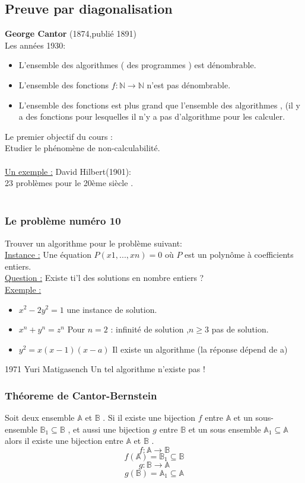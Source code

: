 \documentclass[base.tex]{subfiles}
\begin{document}
\subsection{Preuve par diagonalisation}
\textbf{George Cantor} (1874,publié 1891)
\\
Les années 1930:
\begin{itemize}
\item L'ensemble des algorithmes ( des programmes ) est dénombrable.
\item L'ensemble des fonctions $f:\mathbb{N}\rightarrow\mathbb{N}$ n'est pas dénombrable.
\item L'ensemble des fonctions est plus grand que l'ensemble des algorithmes , (il y a des fonctions pour lesquelles il n'y a pas d'algorithme pour les calculer.
\end{itemize}
Le premier objectif du cours : \\
Etudier le phénomène de non-calculabilité.\\
\\
\underline{Un exemple :} David Hilbert(1901):\\
23 problèmes pour le 20ème siècle .
\\
\\
\subsubsection{Le problème numéro 10}
Trouver un algorithme pour le problème suivant:\\
\underline{Instance :} Une équation $P(x1,...,xn) = 0$ où $P$ est un polynôme à coefficients entiers. \\
\underline{Question :} Existe ti'l des solutions en nombre entiers ?\\
\underline{Exemple :}
\begin{itemize}
\item $x^2 - 2y^2 = 1$ une instance de solution.
\item $x^n+y^n=z^n$ Pour $n=2$ : infinité de solution ,$n\geq3$ pas de solution.
  \item $y^2 = x(x-1)(x-a)$ Il existe un algorithme (la réponse dépend de a)
\end{itemize}
1971 Yuri Matigasench
Un tel algorithme n'existe pas !

\subsubsection{Théoreme de Cantor-Bernstein}
Soit deux ensemble $\mathbb{A}$ et $\mathbb{B}$ .
Si il existe une bijection $f$ entre $\mathbb{A}$ et un sous-ensemble $\mathbb{B}_1\subseteq\mathbb{B}$ , et aussi une bijection $g$ entre $\mathbb{B}$ et un sous ensemble $\mathbb{A}_1\subseteq\mathbb{A}$ alors il existe une bijection entre $\mathbb{A}$ et $\mathbb{B}$ .
\[f:\mathbb{A}\rightarrow\mathbb{B}\]
\[f(\mathbb{A})=\mathbb{B}_1\subseteq\mathbb{B}\]
\[g:\mathbb{B}\rightarrow\mathbb{A}\]
\[g(\mathbb{B})=\mathbb{A}_1\subseteq\mathbb{A}\]
\end{document}
